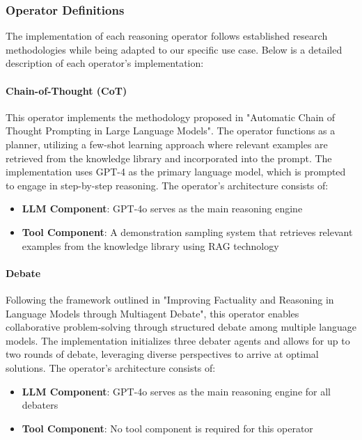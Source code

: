 \documentclass[../Main.tex]{subfiles}
\begin{document}
\subsubsection{Operator Definitions}
\label{section:5.1.3.1_operator_definitions}

The implementation of each reasoning operator follows established research methodologies while being adapted to our specific use case. Below is a detailed description of each operator's implementation:

\paragraph{Chain-of-Thought (CoT)} This operator implements the methodology proposed in "Automatic Chain of Thought Prompting in Large Language Models". The operator functions as a planner, utilizing a few-shot learning approach where relevant examples are retrieved from the knowledge library and incorporated into the prompt. The implementation uses GPT-4 as the primary language model, which is prompted to engage in step-by-step reasoning. The operator's architecture consists of:

\begin{itemize}
    \item \textbf{LLM Component}: GPT-4o serves as the main reasoning engine
    \item \textbf{Tool Component}: A demonstration sampling system that retrieves relevant examples from the knowledge library using RAG technology
\end{itemize}

\paragraph{Debate} Following the framework outlined in "Improving Factuality and Reasoning in Language Models through Multiagent Debate", this operator enables collaborative problem-solving through structured debate among multiple language models. The implementation initializes three debater agents and allows for up to two rounds of debate, leveraging diverse perspectives to arrive at optimal solutions. The operator's architecture consists of:

\begin{itemize}
    \item \textbf{LLM Component}: GPT-4o serves as the main reasoning engine for all debaters
    \item \textbf{Tool Component}: No tool component is required for this operator
\end{itemize}
\end{document}
